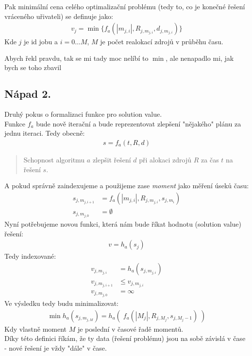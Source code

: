 \documentclass[11pt]{article}
\begin{document}
    Pak minimální cena celého optimalizační problému (tedy to, co je konečné řešení vráceného uřivateli) se definuje jako:
    \begin{align*}
        v_{j} = \min \{ f_{a}(|m_{j, i}|, R_{j, m_{j, i}}, d_{j, m_{j, i}}) \}
    \end{align*}
    Kde $j$ je id jobu a $i = 0\dots M$, $M$ je počet realokací zdrojů v průběhu času.

    Abych řekl pravdu, tak se mi tady moc nelíbí to $\min$, ale nenapadlo mi, jak bych se toho zbavil

    \subsection{Nápad 2.}\label{subsec:napad-2}
    Druhý pokus o formalizaci funkce pro solution value.\\
    Funkce $f_a$ bude nově iterační a bude reprezentovat zlepšení "nějakého" plánu za jednu iteraci.
    Tedy obecně:
    \begin{align*}
        s = f_a(t, R, d)
    \end{align*}

    \begin{quotation}
        Schopnost algoritmu $a$ zlepšit řešení $d$ při alokaci zdrojů $R$ za čas $t$ na řešení $s$.
    \end{quotation}

    A pokud správně zaindexujeme a použijeme zase \textit{moment} jako měření úseků času:
    \begin{align*}
        s_{j, m_{j,i+1}} &= f_{a}(|m_{j,i}|, R_{j, m_{j, i}}, s_{j, m_{i}})\\
        s_{j, m_{j, 0}} &= \emptyset
    \end{align*}
    Nyní potřebujeme novou funkci, která nám bude říkat hodnotu (solution value) řešení:
    \begin{align*}
        v = h_{a}(s_{j})
    \end{align*}
    Tedy indexované:
    \begin{align*}
        v_{j, m_{j, i}} &= h_{a} ( s_{j, m_{j, i}} )\\
        v_{j, m_{j, i + 1}} & \leq v_{j, m_{j, i}}\\
        v_{j, m_{j, 0}} &= \infty
    \end{align*}
    Ve výsledku tedy budu minimalizovat:
    \begin{align*}
        \min h_{a}(s_{j, m_{j, M}}) = h_{a}(\; f_{a}(|M_{j}|, R_{j, M_{j}}, s_{j, M_{j}-1}) \;)
    \end{align*}
    Kdy vlastně moment $M$ je poslední v časové řadě momentů.\\
    Díky této definici říkám, že ty data (řešení problému) jsou na sobě závislá v čase - nové řešení
    je vždy "dále" v čase.
\end{document}
